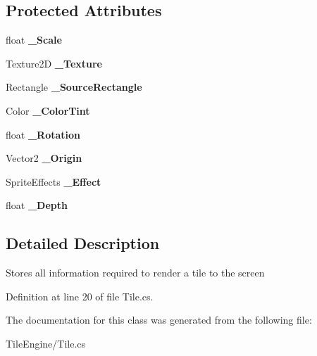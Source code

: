 \subsection*{Protected Attributes}
\begin{DoxyCompactItemize}
\item 
\hypertarget{class_tile_engine_1_1_tile_a3af1f4f1805b8b2bcd76ca550782ae55}{float {\bfseries \-\_\-\-Scale}}\label{class_tile_engine_1_1_tile_a3af1f4f1805b8b2bcd76ca550782ae55}

\item 
\hypertarget{class_tile_engine_1_1_tile_a0b1c2c935ededa1553ce38123605a62e}{Texture2\-D {\bfseries \-\_\-\-Texture}}\label{class_tile_engine_1_1_tile_a0b1c2c935ededa1553ce38123605a62e}

\item 
\hypertarget{class_tile_engine_1_1_tile_a8f440ad4fabaa0d462678303a7db6899}{Rectangle {\bfseries \-\_\-\-Source\-Rectangle}}\label{class_tile_engine_1_1_tile_a8f440ad4fabaa0d462678303a7db6899}

\item 
\hypertarget{class_tile_engine_1_1_tile_aadf2ea72c51446dbf3bac276d0f98de7}{Color {\bfseries \-\_\-\-Color\-Tint}}\label{class_tile_engine_1_1_tile_aadf2ea72c51446dbf3bac276d0f98de7}

\item 
\hypertarget{class_tile_engine_1_1_tile_a42d3f7d694c7a8422da6a9186a8e42a2}{float {\bfseries \-\_\-\-Rotation}}\label{class_tile_engine_1_1_tile_a42d3f7d694c7a8422da6a9186a8e42a2}

\item 
\hypertarget{class_tile_engine_1_1_tile_ade1613a00f6d458c497b8ddb3d3afffd}{Vector2 {\bfseries \-\_\-\-Origin}}\label{class_tile_engine_1_1_tile_ade1613a00f6d458c497b8ddb3d3afffd}

\item 
\hypertarget{class_tile_engine_1_1_tile_a8b2ca996f09db53cefd26d7ec7ad83a3}{Sprite\-Effects {\bfseries \-\_\-\-Effect}}\label{class_tile_engine_1_1_tile_a8b2ca996f09db53cefd26d7ec7ad83a3}

\item 
\hypertarget{class_tile_engine_1_1_tile_a0b460d5863d5b52b639d55a70b9ecb3e}{float {\bfseries \-\_\-\-Depth}}\label{class_tile_engine_1_1_tile_a0b460d5863d5b52b639d55a70b9ecb3e}

\end{DoxyCompactItemize}


\subsection{Detailed Description}
Stores all information required to render a tile to the screen 



Definition at line 20 of file Tile.\-cs.



The documentation for this class was generated from the following file\-:\begin{DoxyCompactItemize}
\item 
Tile\-Engine/Tile.\-cs\end{DoxyCompactItemize}
